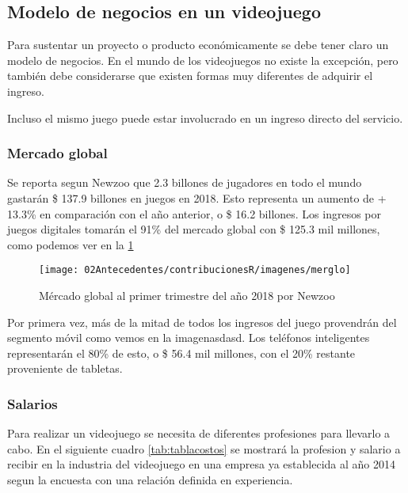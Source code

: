 \subsection{Modelo de negocios en un videojuego}\label{modeloNegocio}
Para sustentar un proyecto o producto económicamente se debe tener claro un modelo de negocios. En el mundo de los videojuegos no existe la excepción, pero también debe considerarse que existen formas muy diferentes de adquirir el ingreso.

Incluso el mismo juego puede estar involucrado en un ingreso directo del servicio.

\subsubsection{Mercado global}
Se reporta segun Newzoo \cite{newzoo2018} que 2.3 billones de jugadores en todo el mundo gastarán \$ 137.9 billones en juegos en 2018. Esto representa un aumento de + 13.3\% en comparación con el año anterior, o \$ 16.2 billones. Los ingresos por juegos digitales tomarán el 91\% del mercado global con \$ 125.3 mil millones, como podemos ver en la \ref{fig:merglo}
\begin{figure}
	\centering
	\caption{Mércado global al primer trimestre del año 2018 por Newzoo \cite{newzoo2018}}
	\label{fig:merglo}
	\texttt{[image: 02Antecedentes/contribucionesR/imagenes/merglo]}
\end{figure}

Por primera vez, más de la mitad de todos los ingresos del juego provendrán del segmento móvil como vemos en la imagen{asdasd}. Los teléfonos inteligentes representarán el 80\% de esto, o \$ 56.4 mil millones, con el 20\% restante proveniente de tabletas.

\subsubsection{Salarios}
Para realizar un videojuego se necesita de diferentes profesiones para llevarlo a cabo.
En el siguiente cuadro \ref{tab:tablacostos} se mostrará la profesion y salario a recibir en la industria del videojuego en una empresa ya establecida al año 2014 segun la encuesta con una relación definida en experiencia.

